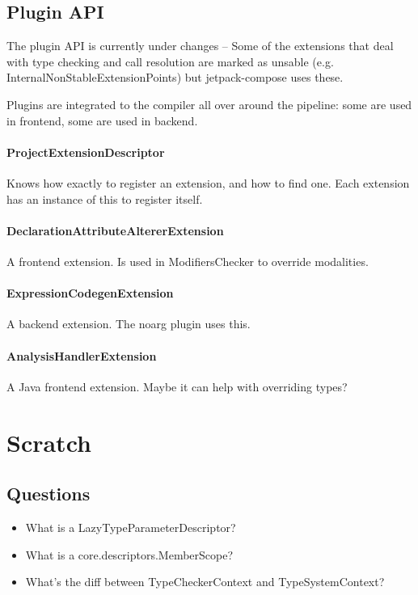 \documentclass{article}
\begin{document}
\subsection{Plugin API}

The plugin API is currently under changes -- Some of the extensions that deal with type checking and call resolution are marked as unsable (e.g. InternalNonStableExtensionPoints) but jetpack-compose uses these.

Plugins are integrated to the compiler all over around the pipeline: some are used in frontend, some are used in backend.

\paragraph{ProjectExtensionDescriptor} Knows how exactly to register an extension, and how to find one. Each extension has an instance of this to register itself.

\paragraph{DeclarationAttributeAltererExtension} A frontend extension. Is used in ModifiersChecker to override modalities.

\paragraph{ExpressionCodegenExtension}
A backend extension. The noarg plugin uses this. 

\paragraph{AnalysisHandlerExtension}
A Java frontend extension. Maybe it can help with overriding types?

\section{Scratch}

\subsection{Questions}

\begin{itemize}
    \item What is a LazyTypeParameterDescriptor?
    \item What is a core.descriptors.MemberScope?
    \item What's the diff between TypeCheckerContext and TypeSystemContext?
\end{itemize}
\end{document}
